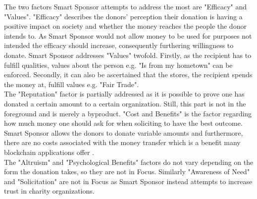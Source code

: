  The two factors Smart Sponsor attempts to address the most are "Efficacy" and "Values". "Efficacy" describes the donors' perception their donation is having a positive impact on society and whether the money reaches the people the donor intends to. As Smart Sponsor would not allow money to be used for purposes not intended the efficacy should increase, consequently furthering willingness to donate. Smart Sponsor addresses "Values" twofold. Firstly, as the recipient has to fulfill qualities, values about the person e.g. "Is from my hometown" can be enforced. Secondly, it can also be ascertained that the stores, the recipient spends the money at, fulfill values e.g. "Fair Trade".\\
 The "Reputation" factor is partially addressed as it is possible to prove one has donated a certain amount to a certain organization. Still, this part is not in the foreground and is merely a byproduct. "Cost and Benefits" is the factor regarding how much money one should ask for when soliciting to have the best outcome. Smart Sponsor allows the donors to donate variable amounts and furthermore, there are no costs associated with the money transfer which is a benefit many blockchain applications offer \cite{disberse}\cite{alice}.\\
 The "Altruism" and "Psychological Benefits" factors do not vary depending on the form the donation takes, so they are not in Focus. Similarly "Awareness of Need" and "Solicitation" are not in Focus as Smart Sponsor instead attempts to increase trust in charity organizations.
